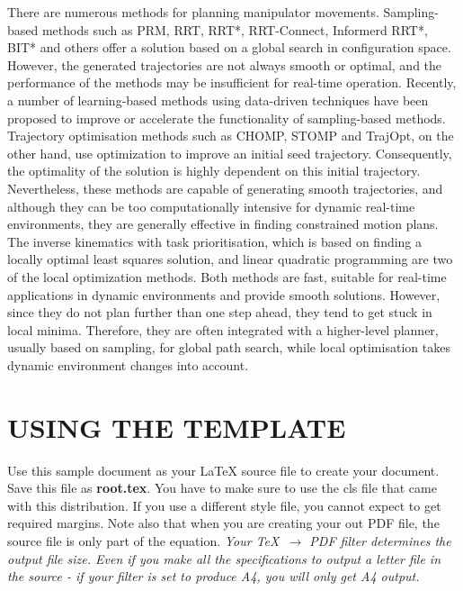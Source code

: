 \documentclass[letterpaper, 10 pt, conference]{ieeeconf}  %
\begin{document}
There are numerous methods for planning manipulator movements. Sampling-based methods such as PRM, RRT, RRT*, RRT-Connect, Informerd RRT*, BIT* and others offer a solution based on a global search in configuration space. However, the generated trajectories are not always smooth or optimal, and the performance of the methods may be insufficient for real-time operation. Recently, a number of learning-based methods using data-driven techniques have been proposed to improve or accelerate the functionality of sampling-based methods.  Trajectory optimisation methods such as CHOMP, STOMP and TrajOpt, on the other hand, use optimization to improve an initial seed trajectory. Consequently, the optimality of the solution is highly dependent on this initial trajectory. Nevertheless, these methods are capable of generating smooth trajectories, and although they can be too computationally intensive for dynamic real-time environments, they are generally effective in finding constrained motion plans. The inverse kinematics with task prioritisation, which is based on finding a locally optimal least squares solution, and linear quadratic programming are two of the local optimization methods. Both methods are fast, suitable for real-time applications in dynamic environments and provide smooth solutions. However, since they do not plan further than one step ahead, they tend to get stuck in local minima. Therefore, they are often integrated with a higher-level planner, usually based on sampling, for global path search, while local optimisation takes dynamic environment changes into account.



%








\clearpage

\section{USING THE TEMPLATE}

Use this sample document as your LaTeX source file to create your document. Save this file as {\bf root.tex}. You have to make sure to use the cls file that came with this distribution. If you use a different style file, you cannot expect to get required margins. Note also that when you are creating your out PDF file, the source file is only part of the equation. {\it Your \TeX\ $\rightarrow$ PDF filter determines the output file size. Even if you make all the specifications to output a letter file in the source - if your filter is set to produce A4, you will only get A4 output. }
\end{document}
